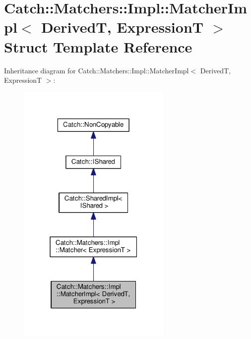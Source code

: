 \hypertarget{structCatch_1_1Matchers_1_1Impl_1_1MatcherImpl}{}\section{Catch\+:\+:Matchers\+:\+:Impl\+:\+:Matcher\+Impl$<$ DerivedT, ExpressionT $>$ Struct Template Reference}
\label{structCatch_1_1Matchers_1_1Impl_1_1MatcherImpl}


Inheritance diagram for Catch\+:\+:Matchers\+:\+:Impl\+:\+:Matcher\+Impl$<$ DerivedT, ExpressionT $>$\+:
\nopagebreak
\begin{figure}[H]
\begin{center}
\leavevmode
\includegraphics[width=211pt]{structCatch_1_1Matchers_1_1Impl_1_1MatcherImpl__inherit__graph}
\end{center}
\end{figure}


